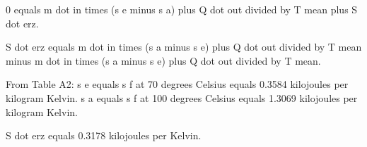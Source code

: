 0 equals m dot in times (s e minus s a) plus Q dot out divided by T mean plus S dot erz.  

S dot erz equals m dot in times (s a minus s e) plus Q dot out divided by T mean minus m dot in times (s a minus s e) plus Q dot out divided by T mean.  

From Table A2:  
s e equals s f at 70 degrees Celsius equals 0.3584 kilojoules per kilogram Kelvin.  
s a equals s f at 100 degrees Celsius equals 1.3069 kilojoules per kilogram Kelvin.  

S dot erz equals 0.3178 kilojoules per Kelvin.